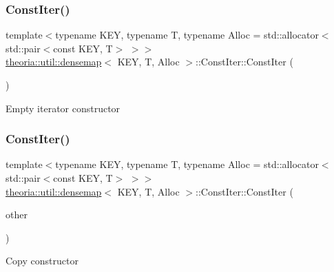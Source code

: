 \subsubsection{\texorpdfstring{Const\+Iter()}{ConstIter()}\hspace{0.1cm}{\footnotesize\ttfamily [1/3]}}
{\footnotesize\ttfamily template$<$typename K\+EY, typename T, typename Alloc = std\+::allocator$<$std\+::pair$<$const K\+E\+Y, T$>$ $>$$>$ \\
\hyperlink{classtheoria_1_1util_1_1densemap}{theoria\+::util\+::densemap}$<$ K\+EY, T, Alloc $>$\+::Const\+Iter\+::\+Const\+Iter (\begin{DoxyParamCaption}{ }\end{DoxyParamCaption})\hspace{0.3cm}{\ttfamily [inline]}}

Empty iterator constructor \mbox{\label{classtheoria_1_1util_1_1densemap_1_1ConstIter_a41f22939ee0096d9d395f211fa757726}} 
\subsubsection{\texorpdfstring{Const\+Iter()}{ConstIter()}\hspace{0.1cm}{\footnotesize\ttfamily [2/3]}}
{\footnotesize\ttfamily template$<$typename K\+EY, typename T, typename Alloc = std\+::allocator$<$std\+::pair$<$const K\+E\+Y, T$>$ $>$$>$ \\
\hyperlink{classtheoria_1_1util_1_1densemap}{theoria\+::util\+::densemap}$<$ K\+EY, T, Alloc $>$\+::Const\+Iter\+::\+Const\+Iter (\begin{DoxyParamCaption}\item[{const \hyperlink{classtheoria_1_1util_1_1densemap_1_1ConstIter}{Const\+Iter} \&}]{other }\end{DoxyParamCaption})\hspace{0.3cm}{\ttfamily [inline]}}

Copy constructor \mbox{\label{classtheoria_1_1util_1_1densemap_1_1ConstIter_a393d12065a54dfadd07acb3268054695}} 
